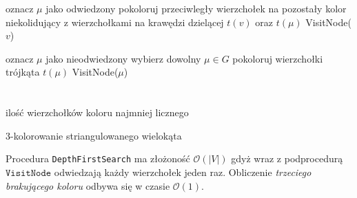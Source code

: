 \documentclass[a4paper,11pt]{article}
\theoremstyle{mytheor}
\begin{document}
\begin{algorithm}
    \begin{algorithmic}[1]
        \State oznacz $\mu$ jako odwiedzony
        \State pokoloruj przeciwległy wierzchołek na pozostały kolor niekolidujący z wierzchołkami na krawędzi dzielącej $t(v)$ oraz $t(\mu)$
        \State VisitNode($v$)
        \EndIf
        \EndFor
        \EndFunction
        
        \State oznacz $\mu$ jako nieodwiedzony
        \EndFor
        \State wybierz dowolny $\mu \in G$
        \State pokoloruj wierzchołki trójkąta $t(\mu)$
        \State VisitNode($\mu$)
        \EndFunction \\\\
        \\
        \Return ilość wierzchołków koloru najmniej licznego
    \end{algorithmic}
    \caption{3-kolorowanie striangulowanego wielokąta}
    Procedura \texttt{DepthFirstSearch} ma złożoność $\mathcal{O}(|V|)$ gdyż wraz z podprocedurą $\texttt{VisitNode}$ odwiedzają każdy wierzchołek jeden raz. Obliczenie \textit{trzeciego brakującego koloru} odbywa się w czasie $\mathcal{O}(1)$.
\end{algorithm}
\end{document}
